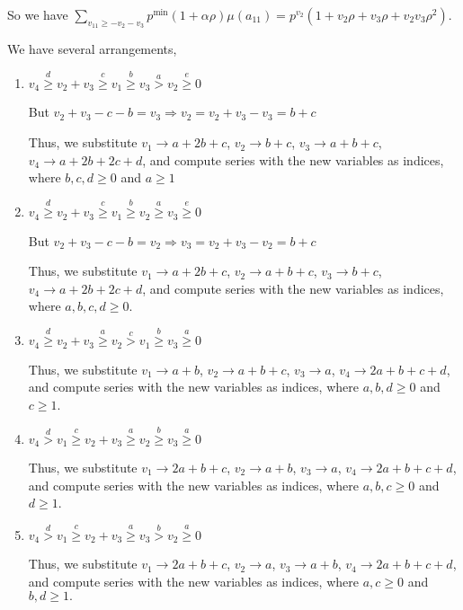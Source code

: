 \documentclass{article}
\begin{document}
So we have $\sum_{v_{11}\geq{-v_2-v_3}}p^{\min}(1+\alpha\rho)\mu(a_{11})=p^{v_2}(1+v_2\rho+v_3\rho+v_2v_3\rho^2).$

We have several arrangements,
\begin{enumerate}
\item 
$v_4\overset{d}{\geq}v_2+v_3\overset{c}{\geq}v_1\overset{b}{\geq}{v_3}\overset{a}{>}v_2\overset{e}{\geq}{0}$

But $v_2+v_3-c-b=v_3\Rightarrow{v_2=v_2+v_3-v_3=b+c}$

Thus, we substitute 
$v_1\rightarrow{a+2b+c}$, 
$v_2\rightarrow{b+c}$, 
$v_3\rightarrow{a+b+c}$, 
$v_4\rightarrow{a+2b+2c+d}$, and compute series with the new variables as indices, where $b,c,d\geq{0}$ and $a\geq{1}$

\item 
$v_4\overset{d}{\geq}v_2+v_3\overset{c}{\geq}v_1\overset{b}{\geq}{v_2}\overset{a}{\geq}v_3\overset{e}{\geq}{0}$

But $v_2+v_3-c-b=v_2\Rightarrow{v_3=v_2+v_3-v_2=b+c}$

Thus, we substitute 
$v_1\rightarrow{a+2b+c}$, 
$v_2\rightarrow{a+b+c}$, 
$v_3\rightarrow{b+c}$, 
$v_4\rightarrow{a+2b+2c+d}$, and compute series with the new variables as indices, where $a,b,c,d\geq{0}$.
\item 
$v_4\overset{d}{\geq}v_2+v_3\overset{a}{\geq}v_2\overset{c}{>}{v_1}\overset{b}{\geq}v_3\overset{a}{\geq}{0}$


Thus, we substitute 
$v_1\rightarrow{a+b}$, 
$v_2\rightarrow{a+b+c}$, 
$v_3\rightarrow{a}$, 
$v_4\rightarrow{2a+b+c+d}$, and compute series with the new variables as indices, where $a,b,d\geq{0}$ and $c\geq{1}$.

\item 
$v_4\overset{d}{>}v_1\overset{c}{\geq}v_2+v_3\overset{a}{\geq}{v_2}\overset{b}{\geq}v_3\overset{a}{\geq}{0}$

Thus, we substitute 
$v_1\rightarrow{2a+b+c}$, 
$v_2\rightarrow{a+b}$, 
$v_3\rightarrow{a}$, 
$v_4\rightarrow{2a+b+c+d}$, and compute series with the new variables as indices, where $a,b,c\geq{0}$ and $d\geq{1}$.

\item 
$v_4\overset{d}{>}v_1\overset{c}{\geq}v_2+v_3\overset{a}{\geq}{v_3}\overset{b}{>}v_2\overset{a}{\geq}{0}$

Thus, we substitute 
$v_1\rightarrow{2a+b+c}$, 
$v_2\rightarrow{a}$, 
$v_3\rightarrow{a+b}$, 
$v_4\rightarrow{2a+b+c+d}$, and compute series with the new variables as indices, where $a,c\geq{0}$ and $b,d\geq{1}.$

\end{enumerate}
\end{document}
